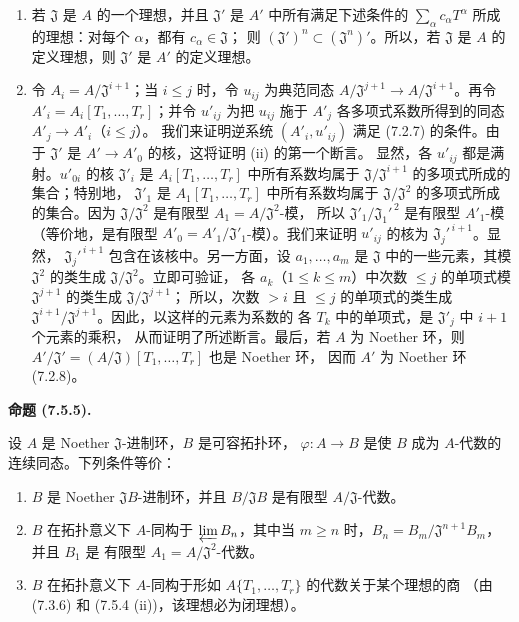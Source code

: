 \documentclass[UTF8,fontset=none,11pt,oneside,openany]{ctexbook}
\newenvironment{proposition}[1][]{%
  \par\medskip\noindent\textbf{命题 (#1).}\ %
}{\par}
\let\EGAOriginalLabel\label
\renewcommand{\label}[1]{\phantomsection\EGAOriginalLabel{#1}}
\begin{document}
\begin{enumerate}
  \item[(i)] 若 $\mathfrak J$ 是 $A$ 的一个理想，并且 $\mathfrak J'$
  是 $A'$ 中所有满足下述条件的 $\sum_\alpha c_\alpha T^\alpha$
  所成的理想：对每个 $\alpha$，都有 $c_\alpha\in\mathfrak J$；
  则 $(\mathfrak J')^n\subset(\mathfrak J^n)'$。所以，若 $\mathfrak J$
  是 $A$ 的定义理想，则 $\mathfrak J'$ 是 $A'$ 的定义理想。

  \item[(ii)] 令 $A_i=A/\mathfrak J^{i+1}$；当 $i\leq j$ 时，令
  $u_{ij}$ 为典范同态
  $A/\mathfrak J^{j+1}\to A/\mathfrak J^{i+1}$。再令
  $A'_i=A_i[T_1,\ldots,T_r]$；并令 $u'_{ij}$ 为把 $u_{ij}$ 施于
  $A'_j$ 各多项式系数所得到的同态 $A'_j\to A'_i$（$i\leq j$）。
  我们来证明逆系统 $(A'_i,u'_{ij})$ 满足 (7.2.7) 的条件。由于
  $\mathfrak J'$ 是 $A'\to A'_0$ 的核，这将证明 (ii) 的第一个断言。
  显然，各 $u'_{ij}$ 都是满射。$u'_{0i}$ 的核 $\mathfrak J'_i$
  是 $A_i[T_1,\ldots,T_r]$ 中所有系数均属于
  $\mathfrak J/\mathfrak J^{i+1}$ 的多项式所成的集合；特别地，
  $\mathfrak J'_1$ 是 $A_1[T_1,\ldots,T_r]$ 中所有系数均属于
  $\mathfrak J/\mathfrak J^2$ 的多项式所成的集合。因为
  $\mathfrak J/\mathfrak J^2$ 是有限型 $A_1=A/\mathfrak J^2$-模，
  所以 $\mathfrak J'_1/\mathfrak J_1'^{\,2}$ 是有限型 $A'_1$-模
  （等价地，是有限型 $A'_0=A'_1/\mathfrak J'_1$-模）。我们来证明
  $u'_{ij}$ 的核为 $\mathfrak J_j'^{\,i+1}$。显然，
  $\mathfrak J_j'^{\,i+1}$ 包含在该核中。另一方面，设
  $a_1,\ldots,a_m$ 是 $\mathfrak J$ 中的一些元素，其模
  $\mathfrak J^2$ 的类生成 $\mathfrak J/\mathfrak J^2$。立即可验证，
  各 $a_k$（$1\leq k\leq m$）中次数 $\leq j$ 的单项式模
  $\mathfrak J^{j+1}$ 的类生成 $\mathfrak J/\mathfrak J^{j+1}$；
  所以，次数 $>i$ 且 $\leq j$ 的单项式的类生成
  $\mathfrak J^{i+1}/\mathfrak J^{j+1}$。因此，以这样的元素为系数的
  各 $T_k$ 中的单项式，是 $\mathfrak J'_j$ 中 $i+1$ 个元素的乘积，
  从而证明了所述断言。最后，若 $A$ 为 Noether 环，则
  $A'/\mathfrak J'=(A/\mathfrak J)[T_1,\ldots,T_r]$ 也是 Noether 环，
  因而 $A'$ 为 Noether 环 (7.2.8)。
\end{enumerate}

\begin{proposition}[7.5.5]
\label{0.7.5.5-fr}
设 $A$ 是 Noether $\mathfrak J$-进制环，$B$ 是可容拓扑环，
$\varphi:A\to B$ 是使 $B$ 成为 $A$-代数的连续同态。下列条件等价：
\begin{enumerate}
  \item[a)] $B$ 是 Noether $\mathfrak JB$-进制环，并且
  $B/\mathfrak JB$ 是有限型 $A/\mathfrak J$-代数。

  \item[b)] $B$ 在拓扑意义下 $A$-同构于 $\varprojlim B_n$，其中当
  $m\geq n$ 时，$B_n=B_m/\mathfrak J^{n+1}B_m$，并且 $B_1$ 是
  有限型 $A_1=A/\mathfrak J^2$-代数。

  \item[c)] $B$ 在拓扑意义下 $A$-同构于形如
  \linebreak $A\{T_1,\ldots,T_r\}$ 的代数关于某个理想的商
  （由 (7.3.6) 和 (7.5.4 (ii))，该理想必为闭理想）。
\end{enumerate}
\end{proposition}
\end{document}
